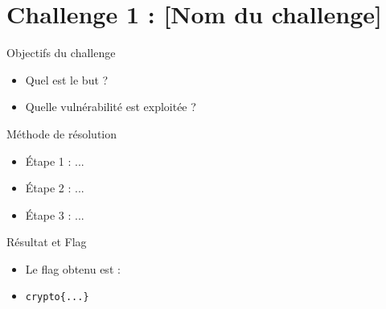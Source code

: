 
\section{Challenge 1 : [Nom du challenge]}

\begin{frame}{Objectifs du challenge}
    \begin{itemize}
        \item Quel est le but ?
        \item Quelle vulnérabilité est exploitée ?
    \end{itemize}
\end{frame}

\begin{frame}{Méthode de résolution}
    \begin{itemize}
        \item Étape 1 : ...
        \item Étape 2 : ...
        \item Étape 3 : ...
    \end{itemize}
\end{frame}

\begin{frame}{Résultat et Flag}
    \begin{itemize}
        \item Le flag obtenu est :
        \item \texttt{crypto\{...\}}
    \end{itemize}
\end{frame}